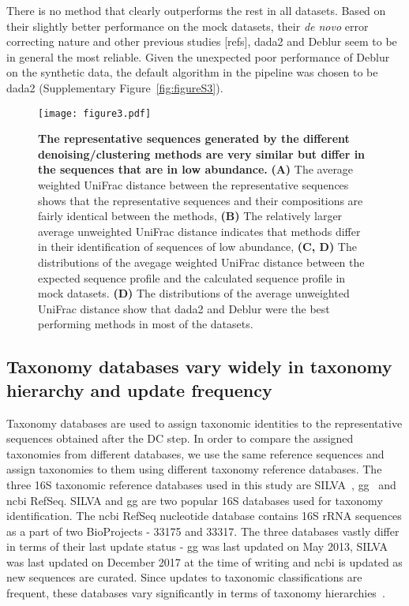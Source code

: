   There is no method that clearly outperforms the rest in all datasets.
  Based on their slightly better performance on the mock datasets, their \textit{de novo} error correcting nature and other previous studies [refs], \ac{dada2} and Deblur seem to be in general the most reliable.
  Given the unexpected poor performance of Deblur on the synthetic data, the default algorithm in the pipeline was chosen to be \ac{dada2} (Supplementary Figure~\ref{fig:figureS3}).

  \begin{figure}
    \centering
    \texttt{[image: figure3.pdf]}
    \caption{
      \textbf{The representative sequences generated by the different denoising/clustering methods are very similar but differ in the sequences that are in low abundance.}
      \textbf{(A)} The average weighted UniFrac distance between the representative sequences shows that the representative sequences and their compositions are fairly identical between the methods,
      \textbf{(B)} The relatively larger average unweighted UniFrac distance indicates that methods differ in their identification of sequences of low abundance,
      \textbf{(C, D)} The distributions of the avegage weighted UniFrac distance between the expected sequence profile and the calculated sequence profile in mock datasets.
      \textbf{(D)} The distributions of the average unweighted UniFrac distance show that dada2 and Deblur were the best performing methods in most of the datasets.
    }
    \label{fig:figure3}
  \end{figure}

  \FloatBarrier

  \subsection*{Taxonomy databases vary widely in taxonomy hierarchy and update frequency}

  Taxonomy databases are used to assign taxonomic identities to the representative sequences obtained after the DC step.
  In order to compare the assigned taxonomies from different databases, we use the same reference sequences and assign taxonomies to them using different taxonomy reference databases.
  The three 16S taxonomic reference databases used in this study are SILVA~\cite{Quast2012}, \ac{gg}~\cite{DeSantis2006} and \ac{ncbi} RefSeq.
  SILVA and \ac{gg} are two popular 16S databases used for taxonomy identification.
  The \ac{ncbi} RefSeq nucleotide database contains 16S rRNA sequences as a part of two BioProjects - 33175 and 33317.
  The three databases vastly differ in terms of their last update status - \ac{gg} was last updated on May 2013, SILVA was last updated on December 2017 at the time of writing and \ac{ncbi} is updated as new sequences are curated.
  Since updates to taxonomic classifications are frequent, these databases vary significantly in terms of taxonomy hierarchies~\cite{Balvociute2017}.

